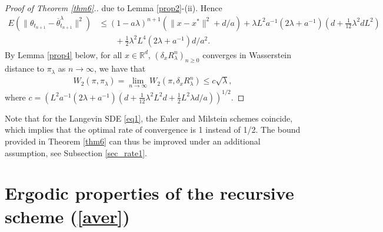\documentclass[a4paper]{article}
\def\pl{\pi_{\lambda}}
\def\Rl{R_{\lambda}}
\def\Rd{\mathbb{R}^{d}}
\def\tlb{\overline{\theta}^{\lambda}}
\def\t{{\theta}}
\begin{document}
\begin{proof}[Proof of Theorem \ref{thm6}.]
	due to Lemma \ref{prop2}-(ii). Hence
	\begin{align}
	E\left(\|\t_{t_{n+1}}-\tlb_{t_{n+1}}\|^2\right)&\leq (1-a\lambda)^{n+1}(\|x-x^*\|^2+d/a)+ \lambda L^2a^{-1}(2\lambda+a^{-1})(d+\tfrac{1}{12}\lambda^2d L^2) \nonumber \\
	&\qquad +\tfrac{1}{2}\lambda^2 L^4(2\lambda+a^{-1})d/a^2. \label{dacom}
	\end{align}
	By Lemma \ref{prop4} below, for all $x \in \Rd$, $(\delta_x \Rl^n)_{n\geq 0}$ converges in Wasserstein distance to $\pl$ as $n \rightarrow \infty$, we have that
	\begin{align*}
	W_2(\pi,\pl)=\lim\limits_{n \rightarrow \infty}W_2(\pi,\delta_x \Rl^n)\leq c \sqrt{\lambda},
	\end{align*}
	where $c=\left(L^2 a^{-1}(2\lambda+a^{-1})(d+\tfrac{1}{12}\lambda^2L^2d+\tfrac{1}{2}L^2\lambda d/a) \right)^{1/2}$.
\end{proof}
Note that for the Langevin SDE \eqref{eq1}, the Euler and Milstein schemes coincide, which implies that the optimal rate of convergence is 1 instead of 1/2. The bound provided in Theorem \ref{thm6} can thus be improved under an additional assumption, see Subsection \ref{sec_rate1}.

\section{Ergodic properties of the recursive scheme (\ref{aver})}\label{sec_aver}
\end{document}
